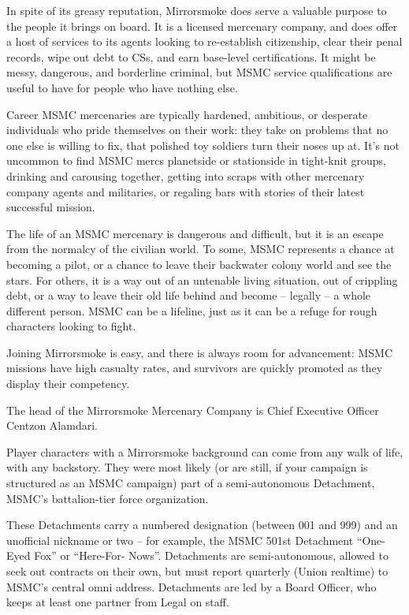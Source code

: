 In spite of its greasy reputation, Mirrorsmoke does serve a valuable purpose to the people it  
brings on board. It is a licensed mercenary company, and does offer a host of services to its  
agents looking to re-establish citizenship, clear their penal records, wipe out debt to CSs, and  
earn base-level certifications. It might be messy, dangerous, and borderline criminal, but MSMC  
service qualifications are useful to have for people who have nothing else. 
 

Career MSMC mercenaries are typically hardened, ambitious, or desperate individuals who pride  
themselves on their work: they take on problems that no one else is willing to fix, that polished  
toy soldiers turn their noses up at. It’s not uncommon to find MSMC mercs planetside or  
stationside in tight-knit groups, drinking and carousing together, getting into scraps with other  
mercenary company agents and militaries, or regaling bars with stories of their latest successful  
mission. 
 

The life of an MSMC mercenary is dangerous and difficult, but it is an escape from the normalcy  
of the civilian world. To some, MSMC represents a chance at becoming a pilot, or a chance to  
leave their backwater colony world and see the stars. For others, it is a way out of an untenable  
living situation, out of crippling debt, or a way to leave their old life behind and become -- legally  
-- a whole different person. MSMC can be a lifeline, just as it can be a refuge for rough  
characters looking to fight. 
 

                                                                                                          


Joining Mirrorsmoke is easy, and there is always room for advancement: MSMC missions have  
high casualty rates, and survivors are quickly promoted as they display their competency. 
 

The head of the Mirrorsmoke Mercenary Company is Chief Executive Officer Centzon Alamdari.  
 

Player characters with a Mirrorsmoke background can come from any walk of life, with any  
backstory. They were most likely (or are still, if your campaign is structured as an MSMC  
campaign) part of a semi-autonomous Detachment, MSMC’s battalion-tier force organization. 
 

These Detachments carry a numbered designation (between 001 and 999) and an unofficial  
nickname or two -- for example, the MSMC 501st Detachment “One-Eyed Fox” or “Here-For- 
Nows”. Detachments are semi-autonomous, allowed to seek out contracts on their own, but  
must report quarterly (Union realtime) to MSMC’s central omni address. Detachments are led by  
a Board Officer, who keeps at least one partner from Legal on staff. 
 

